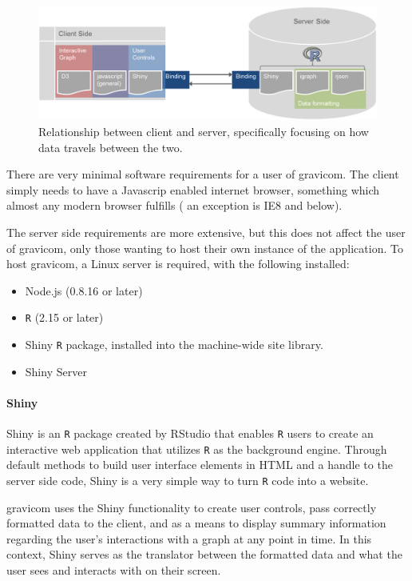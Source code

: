 \documentclass{article}\usepackage[]{graphicx}\usepackage[]{color}
\newcommand{\hh}[1]{{\color{magenta} #1}}
\begin{document}
\begin{figure}[hbtp]
\centering
\includegraphics[width=\textwidth]{images/clientserverflow.png}
\caption{\label{fig:clientserver} Relationship between client and server, specifically focusing on how data travels between the two.}
\end{figure}

There are very minimal software requirements for a user of gravicom. The client simply needs to have a \hh{Javascrip enabled internet} browser, \hh{something} which \hh{almost any modern browser fulfills} (\hh{an exception is} IE8 and below). 

The server side requirements are more extensive, but this does not affect the user of gravicom, only those wanting to host their own instance of the application. To host gravicom, a Linux server is required, with the following installed:

\begin{itemize}
\item Node.js (0.8.16 or later)
\item {\tt R} (2.15 or later)
\item Shiny {\tt R} package, installed into the machine-wide site library. 
\item Shiny Server
\end{itemize}


\paragraph{Shiny}

Shiny \cite{rs-shiny} is an {\tt R} package created by RStudio that enables {\tt R} users to create an interactive web application that utilizes {\tt R} as the background engine. Through default methods to build user interface elements in HTML and a handle to the server side code, Shiny is a very simple way to turn {\tt R} code into a website. 

gravicom uses the Shiny functionality to create user controls, pass correctly formatted data to the client, and as a means to display summary information regarding the user's interactions with a graph at any point in time. In this context, Shiny serves as the translator between the formatted data and what the user sees and interacts with on their screen.
\end{document}
